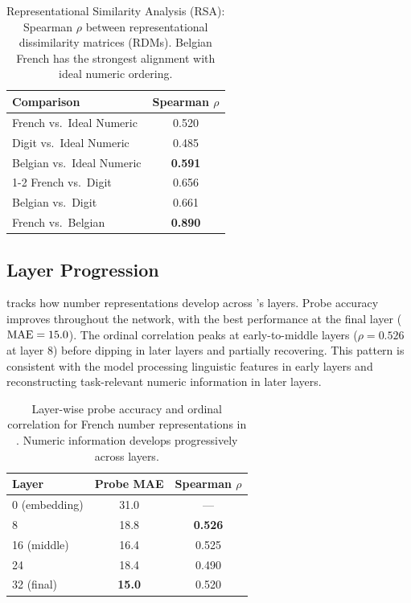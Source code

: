 \begin{table}[t]
    \centering
    \caption{Representational Similarity Analysis (RSA): Spearman $\rho$ between representational dissimilarity matrices (RDMs). Belgian French has the strongest alignment with ideal numeric ordering.}
    \begin{tabular}{@{}lc@{}}
        \toprule
        \textbf{Comparison} & \textbf{Spearman $\rho$} \\
        \midrule
        French vs.\ Ideal Numeric & 0.520 \\
        Digit vs.\ Ideal Numeric & 0.485 \\
        Belgian vs.\ Ideal Numeric & \textbf{0.591} \\
        \cmidrule(lr){1-2}
        French vs.\ Digit & 0.656 \\
        Belgian vs.\ Digit & 0.661 \\
        French vs.\ Belgian & \textbf{0.890} \\
        \bottomrule
    \end{tabular}
    \label{tab:rsa}
\end{table}

\subsection{Layer Progression}
\label{sec:results_layers}

 tracks how number representations develop across \mistral's layers.
Probe accuracy improves throughout the network, with the best performance at the final layer ($\text{MAE} = 15.0$).
The ordinal correlation peaks at early-to-middle layers ($\rho = 0.526$ at layer 8) before dipping in later layers and partially recovering.
This pattern is consistent with the model processing linguistic features in early layers and reconstructing task-relevant numeric information in later layers.

\begin{table}[t]
    \centering
    \caption{Layer-wise probe accuracy and ordinal correlation for French number representations in \mistral. Numeric information develops progressively across layers.}
    \begin{tabular}{@{}lcc@{}}
        \toprule
        \textbf{Layer} & \textbf{Probe MAE} & \textbf{Spearman $\rho$} \\
        \midrule
        0 (embedding) & 31.0 & --- \\
        8 & 18.8 & \textbf{0.526} \\
        16 (middle) & 16.4 & 0.525 \\
        24 & 18.4 & 0.490 \\
        32 (final) & \textbf{15.0} & 0.520 \\
        \bottomrule
    \end{tabular}
    \label{tab:layers}
\end{table}

